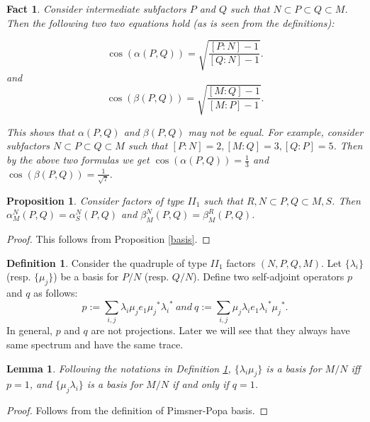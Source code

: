 \documentclass[11pt,letterpaper]{amsart}
\newtheorem{proposition}[theorem]{Proposition}
\newtheorem{lemma}[theorem]{Lemma}
\newtheorem{fact}[theorem]{Fact}
\theoremstyle{definition}
\newtheorem{definition}[theorem]{Definition}
\theoremstyle{remark}
\begin{document}
\begin{fact}\label{inclusion}
 Consider intermediate subfactors $P$ and $Q$ such that $N\subset P\subset Q \subset M$. Then the following two
 two equations hold (as is seen from the definitions):
 
 $$\cos(\alpha(P,Q))= \sqrt{\frac{[P:N]-1}{[Q:N]-1}}.$$ and 
 $$\cos(\beta(P,Q))= \sqrt{\frac{[M:Q]-1}{[M:P]-1}}.$$
 
 This shows that $\alpha(P,Q)$ and $\beta(P,Q)$ may not be equal. For example,
 consider subfactors  $N\subset P\subset Q\subset M$ such that 
 $[P:N]=2,[M:Q]= 3,[Q:P]=5$. Then by the above two formulas we get $\cos(\alpha(P,Q))=\frac{1}{3}$ and
 $\cos(\beta(P,Q))= \frac{1}{\sqrt{7}}$.
\end{fact}
\begin{proposition}
  Consider factors of type $II_1$ such that $R, N\subset P,Q\subset M, S$. Then $\alpha^N_M(P,Q)= \alpha^N_S(P,Q)$
  and  $\beta^N_M(P,Q)= \beta^R_M(P,Q)$.
\end{proposition}
\begin{proof}
 This follows from Proposition \ref{basis}.
\end{proof}
\begin{definition}\label{p and q}
 Consider the quadruple of type $II_1$ factors $(N,P,Q,M).$ Let $\{\lambda_i\}$(resp. $\{\mu_j\}$) be a basis for $P/N$ (resp. $Q/N$).
 Define two self-adjoint operators $p$ and $q$ as follows:
 $$p:= \sum_{i,j}{\lambda_i}\mu_j e_1 {\mu_j}^*{\lambda_i}^*~ and ~q:= \sum_{i,j}\mu_j \lambda_i e_1 {\lambda_i}^* {\mu_j}^*.$$
In general, $p$ and $q$ are not projections. Later we will see that they always have same spectrum and have the same trace.
\end{definition}

\begin{lemma}\label{Lem:p=1}
Following the notations in Definition \ref{p and q}, $\{\lambda_i\mu_j\}$ is a basis for $M/N$ iff $p=1$, and $\{\mu_j\lambda_i\}$ is a basis for $M/N$ if and only if $q=1$.
\end{lemma}

\begin{proof}
Follows from the definition of Pimsner-Popa basis.
\end{proof}
\end{document}
